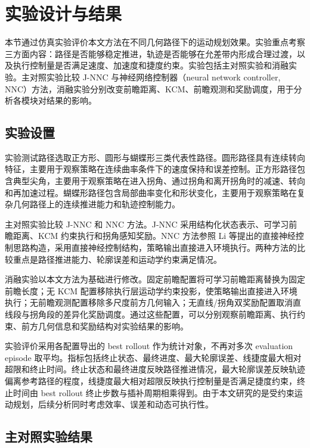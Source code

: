 \documentclass[preprint,12pt]{elsarticle}
\begin{document}
\section{实验设计与结果}
\label{sec:experiments}

本节通过仿真实验评价本文方法在不同几何路径下的运动规划效果。实验重点考察三方面内容：路径是否能够稳定推进，轨迹是否能够在允差带内形成合理过渡，以及执行控制量是否满足速度、加速度和捷度约束。实验包括主对照实验和消融实验。主对照实验比较 J-NNC 与神经网络控制器（neural network controller, NNC）方法，消融实验分别改变前瞻距离、KCM、前瞻观测和奖励调度，用于分析各模块对结果的影响。

\subsection{实验设置}

实验测试路径选取正方形、圆形与蝴蝶形三类代表性路径。圆形路径具有连续转向特征，主要用于观察策略在连续曲率条件下的速度保持和误差控制。正方形路径包含典型尖角，主要用于观察策略在进入拐角、通过拐角和离开拐角时的减速、转向和再加速过程。蝴蝶形路径包含局部曲率变化和形状变化，主要用于观察策略在复杂几何路径上的连续推进能力和轨迹控制能力。

主对照实验比较 J-NNC 和 NNC 方法。J-NNC 采用结构化状态表示、可学习前瞻距离、KCM 约束执行和拐角感知奖励。NNC 方法参照 Li 等\cite{Li2020}提出的直接神经控制思路构造，采用直接神经控制结构，策略输出直接进入环境执行。两种方法的比较重点是路径推进能力、轮廓误差和运动学约束满足情况。

消融实验以本文方法为基础进行修改。固定前瞻配置将可学习前瞻距离替换为固定前瞻长度；无 KCM 配置移除执行层运动学约束投影，使策略输出直接进入环境执行；无前瞻观测配置移除多尺度前方几何输入；无直线/拐角双奖励配置取消直线段与拐角段的差异化奖励调度。通过这些配置，可以分别观察前瞻距离、执行约束、前方几何信息和奖励结构对实验结果的影响。

实验评价采用各配置导出的 best rollout 作为统计对象，不再对多次 evaluation episode 取平均。指标包括终止状态、最终进度、最大轮廓误差、线捷度最大相对超限和终止时间。终止状态和最终进度反映路径推进情况，最大轮廓误差反映轨迹偏离参考路径的程度，线捷度最大相对超限反映执行控制量是否满足捷度约束，终止时间由 best rollout 终止步数与插补周期相乘得到。由于本文研究的是受约束运动规划，后续分析同时考虑效率、误差和动态可执行性。

\subsection{主对照实验结果}
\end{document}
